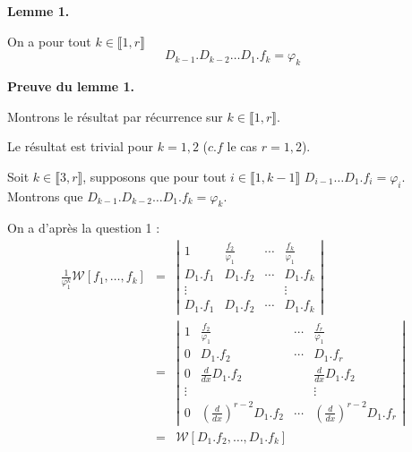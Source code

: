 \textbf{Lemme 1.}

On a pour tout $k \in \llbracket 1, r \rrbracket$
\[ D_{k - 1} .D_{k - 2} \ldots D_1 .f_k = \varphi_k \]


\textbf{Preuve du lemme 1.}

Montrons le r{\'e}sultat par r{\'e}currence sur $k \in \llbracket 1, r
\rrbracket$.

Le r{\'e}sultat est trivial pour $k = 1, 2$ ($c.f$ le cas $r = 1, 2$).

Soit $k \in \llbracket 3, r \rrbracket$, supposons que pour tout $i \in
\llbracket 1, k - 1 \rrbracket$ $D_{i - 1} \ldots D_1 .f_i = \varphi_i$.
Montrons que $D_{k - 1} .D_{k - 2} \ldots D_1 .f_k = \varphi_k$.

On a d'apr{\`e}s la question 1 :
\begin{eqnarray*}
  \frac{1}{\varphi^k_1} \mathcal{W} [f_1, \ldots, f_k] & = & \left|
  \begin{array}{cccc}
    1 & \frac{f_2}{\varphi_1} & \cdots & \frac{f_k}{\varphi_1}\\
    D_1 .f_1 & D_1 .f_2 & \cdots & D_1 .f_k\\
    \vdots &  &  & \vdots\\
    D_1 .f_1 & D_1 .f_2 & \cdots & D_1 .f_k
  \end{array} \right|\\
  & = & \left| \begin{array}{cccc}
    1 & \frac{f_2}{\varphi_1} & \cdots & \frac{f_r}{\varphi_1}\\
    0 & D_1 .f_2 & \cdots & D_1 .f_r\\
    0 & \frac{d}{d x} D_1 .f_2 &  & \frac{d}{d x} D_1 .f_2\\
    \vdots &  &  & \vdots\\
    0 & \left( \frac{d}{d x} \right)^{r - 2} D_1 .f_2 & \cdots & \left(
    \frac{d}{d x} \right)^{r - 2} D_1 .f_r
  \end{array} \right|\\
  & = & \mathcal{W} [D_1 .f_2, \ldots, D_1 .f_k]
\end{eqnarray*}


